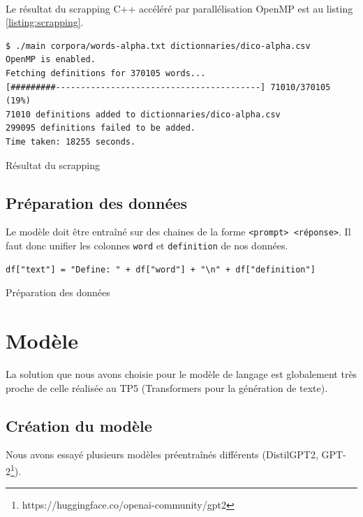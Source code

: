 \documentclass[french]{template}
\begin{document}
\

Le résultat du scrapping C++ accéléré par parallélisation OpenMP est au listing \ref{listing:scrapping}.

\begin{listing}[H]
    \begin{verbatim}
$ ./main corpora/words-alpha.txt dictionnaries/dico-alpha.csv
OpenMP is enabled.
Fetching definitions for 370105 words...
[#########-----------------------------------------] 71010/370105 (19%)
71010 definitions added to dictionnaries/dico-alpha.csv
299095 definitions failed to be added.
Time taken: 18255 seconds.
\end{verbatim}
    \caption{Résultat du scrapping}
    \label{listing:scrapping}
\end{listing}

\subsection{Préparation des données}

Le modèle doit être entraîné sur des chaines de la forme \texttt{\textless prompt\textgreater\ \textless réponse\textgreater}. Il faut donc unifier les colonnes \texttt{word} et \texttt{definition} de nos données.

\begin{listing}[H]
    \begin{verbatim}
df["text"] = "Define: " + df["word"] + "\n" + df["definition"]
\end{verbatim}
    \caption{Préparation des données}
\end{listing}

\section{Modèle}

La solution que nous avons choisie pour le modèle de langage est globalement très proche de celle réalisée au TP5 (Transformers pour la génération de texte).

\subsection{Création du modèle}

Nous avons essayé plusieurs modèles préentraînés différents (DistilGPT2, GPT-2\footnote{https://huggingface.co/openai-community/gpt2}).
\end{document}
